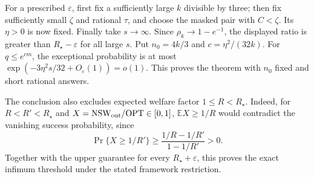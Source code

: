 For a prescribed $\varepsilon$, first fix a sufficiently large $k$
divisible by three; then fix sufficiently small $\zeta$ and rational
$\tau$, and choose the masked pair with $C<\zeta$.  Its $\eta>0$
is now fixed.  Finally take $s\to\infty$.
Since $\rho_k\to1-e^{-1}$, the displayed ratio is greater than
$R_\star-\varepsilon$ for all large $s$.
Put $n_0=4k/3$ and $c=\eta^2/(32k)$.  For $q\le e^{cm}$,
the exceptional probability is at most
$\exp(-3\eta^2s/32+O_\varepsilon(1))=o(1)$.
This proves the theorem with $n_0$ fixed and short rational answers.

The conclusion also excludes expected welfare factor $1\le R<R_\star$.
Indeed, for $R<R'<R_\star$ and
$X=\mathrm{NSW}_{\rm out}/\mathrm{OPT}\in[0,1]$,
$\mathbb EX\ge1/R$ would contradict the vanishing success probability, since
\[
 \Pr\{X\ge1/R'\}\ge
               \frac{1/R-1/R'}{1-1/R'}>0.
\]
Together with the upper guarantee for every $R_\star+\varepsilon$, this
proves the exact infimum threshold under the stated framework restriction.
